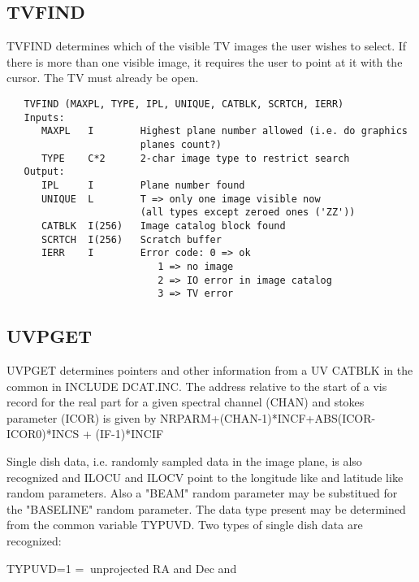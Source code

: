 \subsection{TVFIND}
TVFIND determines which of the visible TV images the user wishes to
select.  If there is more than one visible image, it requires the
user to point at it with the cursor.  The TV must already be open.
\begin{verbatim}
   TVFIND (MAXPL, TYPE, IPL, UNIQUE, CATBLK, SCRTCH, IERR)
   Inputs:
      MAXPL   I        Highest plane number allowed (i.e. do graphics
                       planes count?)
      TYPE    C*2      2-char image type to restrict search
   Output:
      IPL     I        Plane number found
      UNIQUE  L        T => only one image visible now
                       (all types except zeroed ones ('ZZ'))
      CATBLK  I(256)   Image catalog block found
      SCRTCH  I(256)   Scratch buffer
      IERR    I        Error code: 0 => ok
                          1 => no image
                          2 => IO error in image catalog
                          3 => TV error
\end{verbatim}

\subsection{UVPGET}
UVPGET determines pointers and other information from a UV CATBLK in
the common in INCLUDE DCAT.INC.
The address relative to the start of a vis record for the real part
for a given spectral channel (CHAN) and stokes parameter (ICOR)
is given by  NRPARM+(CHAN-1)*INCF+ABS(ICOR-ICOR0)*INCS + (IF-1)*INCIF

Single dish data, i.e. randomly sampled data in the image plane, is
also recognized and ILOCU and ILOCV point to the longitude like and
latitude like random parameters.  Also a "BEAM" random parameter
may be substitued for the "BASELINE" random parameter.  The data
type present may be determined from the common variable TYPUVD.
   Two types of single dish data are recognized:

TYPUVD=1 =$\>$ unprojected RA and Dec and

